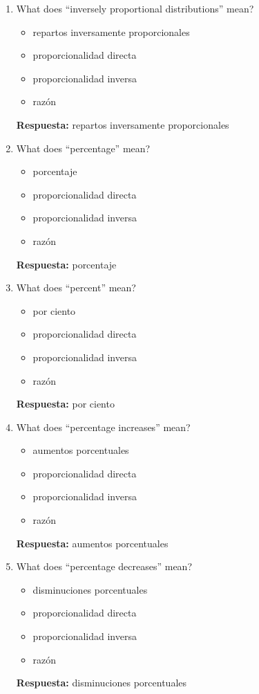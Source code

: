 \documentclass[11pt,a4paper]{article}
\begin{document}
\begin{enumerate}
\begin{itemize}
\end{itemize}
\textbf{Respuesta:} repartos directamente proporcionales
\item What does ``inversely proportional distributions'' mean?
\begin{itemize}
\item repartos inversamente proporcionales
\item proporcionalidad directa
\item proporcionalidad inversa
\item razón
\end{itemize}
\textbf{Respuesta:} repartos inversamente proporcionales
\item What does ``percentage'' mean?
\begin{itemize}
\item porcentaje
\item proporcionalidad directa
\item proporcionalidad inversa
\item razón
\end{itemize}
\textbf{Respuesta:} porcentaje
\item What does ``percent'' mean?
\begin{itemize}
\item por ciento
\item proporcionalidad directa
\item proporcionalidad inversa
\item razón
\end{itemize}
\textbf{Respuesta:} por ciento
\item What does ``percentage increases'' mean?
\begin{itemize}
\item aumentos porcentuales
\item proporcionalidad directa
\item proporcionalidad inversa
\item razón
\end{itemize}
\textbf{Respuesta:} aumentos porcentuales
\item What does ``percentage decreases'' mean?
\begin{itemize}
\item disminuciones porcentuales
\item proporcionalidad directa
\item proporcionalidad inversa
\item razón
\end{itemize}
\textbf{Respuesta:} disminuciones porcentuales

\end{enumerate}
\end{document}
